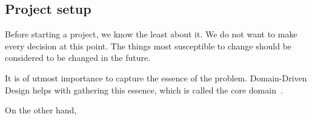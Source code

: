 \subsection{Project setup}\label{sec:project-setup}

Before starting a project,
we know the least about it.
We do not want to make every decision at this point.
The things most susceptible to change
should be considered to be changed in the future.

It is of utmost importance to capture
the essence of the problem.
Domain-Driven Design helps with
gathering this essence,
which is called
the core domain~\cite[Part~I, Chapter~3]{millett_patterns_2015}.

On the other hand,
